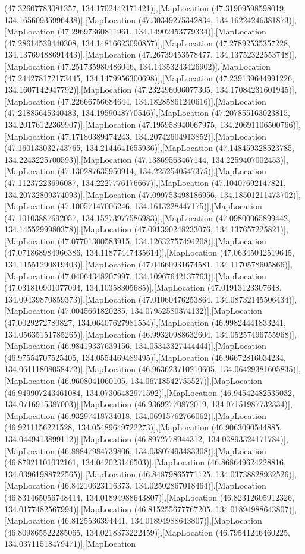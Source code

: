 (47.32607783081357, 134.1702442171421)],[MapLocation (47.31909598598019, 134.16560935996438)],[MapLocation (47.30349275342834, 134.16224246381873)],[MapLocation (47.29697360811961, 134.14902453779334)],[MapLocation (47.28614539440308, 134.14816623090857)],[MapLocation (47.27892535357228, 134.13769488691443)],[MapLocation (47.26739453578477, 134.13752322553748)],[MapLocation (47.251735980486046, 134.14353243426902)],[MapLocation (47.244278172173445, 134.1479956300698)],[MapLocation (47.239139644991226, 134.1607142947792)],[MapLocation (47.232496006077305, 134.17084231601945)],[MapLocation (47.22666756684644, 134.18285861240616)],[MapLocation (47.21885645340483, 134.1959048770546)],[MapLocation (47.207855163023815, 134.20176122369907)],[MapLocation (47.195958940067975, 134.20691106500766)],[MapLocation (47.17180389474243, 134.20742604913852)],[MapLocation (47.160133032743765, 134.2144641655936)],[MapLocation (47.148459328523785, 134.2243225700593)],[MapLocation (47.13869563467144, 134.2259407002453)],[MapLocation (47.130287635950914, 134.2252540547375)],[MapLocation (47.11237223696087, 134.2227776176667)],[MapLocation (47.10407692147821, 134.20732809374093)],[MapLocation (47.099753498186956, 134.18501211473702)],[MapLocation (47.10057147006246, 134.1613228447175)],[MapLocation (47.10103887692057, 134.15273977586983)],[MapLocation (47.09800065899442, 134.1455299980378)],[MapLocation (47.091390248233076, 134.137657225821)],[MapLocation (47.07701300583915, 134.12632757494208)],[MapLocation (47.071868984966386, 134.11877447435614)],[MapLocation (47.06345042519645, 134.11551290819403)],[MapLocation (47.04660931674581, 134.1170578605866)],[MapLocation (47.04064348207997, 134.10967642137763)],[MapLocation (47.031810901077094, 134.10358305685)],[MapLocation (47.01913123307648, 134.09439870859373)],[MapLocation (47.01060476253864, 134.08732145506434)],[MapLocation (47.0045661820285, 134.07952580374132)],[MapLocation (47.0029272780827, 134.06407627981554)],[MapLocation (46.99824441833241, 134.05635151785265)],[MapLocation (46.99320988632604, 134.05257496755968)],[MapLocation (46.98419337639156, 134.05343327444444)],[MapLocation (46.97554707525405, 134.0554469489495)],[MapLocation (46.96672816034234, 134.06111808058472)],[MapLocation (46.963623710210605, 134.06429381605835)],[MapLocation (46.9608041060105, 134.06718542755527)],[MapLocation (46.949907243461084, 134.07306482971592)],[MapLocation (46.94542482535032, 134.0716915387003)],[MapLocation (46.93692770872019, 134.07151987732334)],[MapLocation (46.93297418734018, 134.06915762766062)],[MapLocation (46.9211156221528, 134.05489649722273)],[MapLocation (46.9063090544885, 134.0449413899112)],[MapLocation (46.8972778944312, 134.03893324171784)],[MapLocation (46.88847984739806, 134.03807493483308)],[MapLocation (46.87921101032161, 134.042023146503)],[MapLocation (46.868649624228816, 134.03961988722565)],[MapLocation (46.84879865771125, 134.03738828932526)],[MapLocation (46.84210623116373, 134.02502867018464)],[MapLocation (46.831465056748414, 134.01894988643807)],[MapLocation (46.82312605912326, 134.0177482567994)],[MapLocation (46.815255677767205, 134.01894988643807)],[MapLocation (46.8125536394441, 134.01894988643807)],[MapLocation (46.809865522285065, 134.0218373222459)],[MapLocation (46.79541246460225, 134.03711518479471)],[MapLocation 